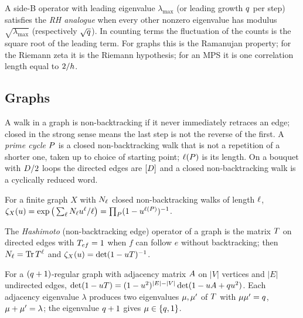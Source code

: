 \begin{definition}
\label{def:rh-analogue}
A side-B operator with leading eigenvalue $\lambda_{\max}$ (or leading
growth $q$ per step) satisfies the \emph{RH analogue} when every other
nonzero eigenvalue has modulus $\sqrt{\lambda_{\max}}$ (respectively
$\sqrt{q}$). In counting terms the fluctuation of the counts is the square
root of the leading term. For graphs this is the Ramanujan property; for the
Riemann zeta it is the Riemann hypothesis; for an MPS it is one correlation
length equal to $2/h$.
\end{definition}

\subsection{Graphs}

\begin{definition}
\label{def:nonbacktracking-walk}
A walk in a graph is non-backtracking if it never immediately retraces an
edge; closed in the strong sense means the last step is not the reverse of
the first. A \emph{prime cycle} $P$ is a closed non-backtracking walk that
is not a repetition of a shorter one, taken up to choice of starting point;
$\ell(P)$ is its length. On a bouquet with $D/2$ loops the directed edges
are $[D]$ and a closed non-backtracking walk is a cyclically reduced word.
\end{definition}

\begin{definition}
\label{def:ihara-zeta}
For a finite graph $X$ with $N_{\ell}$ closed non-backtracking walks of
length $\ell$, $\zeta_{X}(u) = \exp\big(\sum_{\ell}N_{\ell}u^{\ell}/\ell\big)
= \prod_{P}(1-u^{\ell(P)})^{-1}$.
\end{definition}

\begin{definition}
\label{def:hashimoto-operator}
The \emph{Hashimoto} (non-backtracking edge) operator of a graph is the
matrix $T$ on directed edges with $T_{ef} = 1$ when $f$ can follow $e$
without backtracking; then $N_{\ell} = \operatorname{Tr}T^{\ell}$ and
$\zeta_{X}(u) = \det(1-uT)^{-1}$.
\end{definition}

\begin{definition}
\label{def:ihara-bass}
For a $(q+1)$-regular graph with adjacency matrix $A$ on $|V|$
vertices and $|E|$ undirected edges, $\det(1-uT) =
(1-u^2)^{|E|-|V|}\det(1-uA+qu^2)$. Each adjacency eigenvalue
$\lambda$ produces two eigenvalues $\mu,\mu'$ of $T$ with $\mu\mu' = q$,
$\mu+\mu' = \lambda$; the eigenvalue $q+1$ gives $\mu\in\{q,1\}$.
\end{definition}

